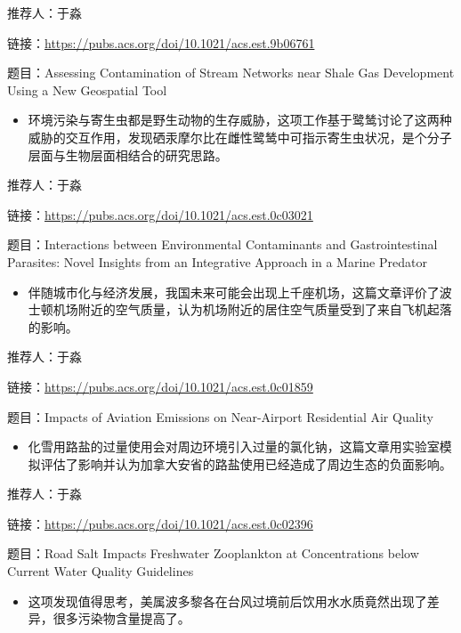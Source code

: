 \documentclass[
]{book}
\providecommand{\tightlist}{%
  \setlength{\itemsep}{0pt}\setlength{\parskip}{0pt}}
\begin{document}
推荐人：于淼

链接：\url{https://pubs.acs.org/doi/10.1021/acs.est.9b06761}

题目：Assessing Contamination of Stream Networks near Shale Gas Development Using a New Geospatial Tool

\begin{itemize}
\tightlist
\item
  环境污染与寄生虫都是野生动物的生存威胁，这项工作基于鹭鸶讨论了这两种威胁的交互作用，发现硒汞摩尔比在雌性鹭鸶中可指示寄生虫状况，是个分子层面与生物层面相结合的研究思路。
\end{itemize}

推荐人：于淼

链接：\url{https://pubs.acs.org/doi/10.1021/acs.est.0c03021}

题目：Interactions between Environmental Contaminants and Gastrointestinal Parasites: Novel Insights from an Integrative Approach in a Marine Predator

\begin{itemize}
\tightlist
\item
  伴随城市化与经济发展，我国未来可能会出现上千座机场，这篇文章评价了波士顿机场附近的空气质量，认为机场附近的居住空气质量受到了来自飞机起落的影响。
\end{itemize}

推荐人：于淼

链接：\url{https://pubs.acs.org/doi/10.1021/acs.est.0c01859}

题目：Impacts of Aviation Emissions on Near-Airport Residential Air Quality

\begin{itemize}
\tightlist
\item
  化雪用路盐的过量使用会对周边环境引入过量的氯化钠，这篇文章用实验室模拟评估了影响并认为加拿大安省的路盐使用已经造成了周边生态的负面影响。
\end{itemize}

推荐人：于淼

链接：\url{https://pubs.acs.org/doi/10.1021/acs.est.0c02396}

题目：Road Salt Impacts Freshwater Zooplankton at Concentrations below Current Water Quality Guidelines

\begin{itemize}
\tightlist
\item
  这项发现值得思考，美属波多黎各在台风过境前后饮用水水质竟然出现了差异，很多污染物含量提高了。
\end{itemize}
\end{document}
